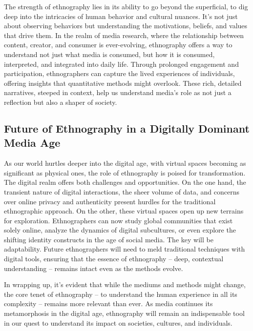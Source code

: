 \documentclass[
  b5paper]{book}
\begin{document}
The strength of ethnography lies in its ability to go beyond the superficial, to dig deep into the intricacies of human behavior and cultural nuances. It's not just about observing behaviors but understanding the motivations, beliefs, and values that drive them. In the realm of media research, where the relationship between content, creator, and consumer is ever-evolving, ethnography offers a way to understand not just what media is consumed, but how it is consumed, interpreted, and integrated into daily life. Through prolonged engagement and participation, ethnographers can capture the lived experiences of individuals, offering insights that quantitative methods might overlook. These rich, detailed narratives, steeped in context, help us understand media's role as not just a reflection but also a shaper of society.

\hypertarget{future-of-ethnography-in-a-digitally-dominant-media-age}{%
\subsection*{Future of Ethnography in a Digitally Dominant Media Age}\label{future-of-ethnography-in-a-digitally-dominant-media-age}}

As our world hurtles deeper into the digital age, with virtual spaces becoming as significant as physical ones, the role of ethnography is poised for transformation. The digital realm offers both challenges and opportunities. On the one hand, the transient nature of digital interactions, the sheer volume of data, and concerns over online privacy and authenticity present hurdles for the traditional ethnographic approach. On the other, these virtual spaces open up new terrains for exploration. Ethnographers can now study global communities that exist solely online, analyze the dynamics of digital subcultures, or even explore the shifting identity constructs in the age of social media. The key will be adaptability. Future ethnographers will need to meld traditional techniques with digital tools, ensuring that the essence of ethnography -- deep, contextual understanding -- remains intact even as the methods evolve.

In wrapping up, it's evident that while the mediums and methods might change, the core tenet of ethnography -- to understand the human experience in all its complexity -- remains more relevant than ever. As media continues its metamorphosis in the digital age, ethnography will remain an indispensable tool in our quest to understand its impact on societies, cultures, and individuals.
\end{document}
